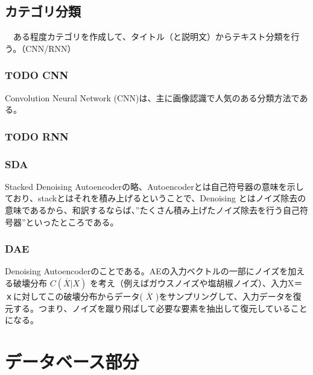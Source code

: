 \documentclass{scrartcl}
\begin{document}
\subsection{カテゴリ分類}
\label{sec:org360a538}
　ある程度カテゴリを作成して、タイトル（と説明文）からテキスト分類を行う。（CNN/RNN）\\
\subsubsection{{\bfseries\sffamily TODO} CNN}
\label{sec:orgfdcfe3a}
Convolution Neural Network (CNN)は、主に画像認識で人気のある分類方法である。\\
\subsubsection{{\bfseries\sffamily TODO} RNN}
\label{sec:org76d83bc}

\subsubsection{SDA \cite{news} \cite{slide01} \cite{page01}}
\label{sec:org4d79792}
Stacked Denoising Autoencoderの略、Autoencoderとは自己符号器の意味を示しており、stackとはそれを積み上げるということで、Denoising とはノイズ除去の意味であるから、和訳するならば、”たくさん積み上げたノイズ除去を行う自己符号器”といったところである。\\

\subsubsection{DAE}
\label{sec:orga78a96a}
Denoising Autoencoderのことである。AEの入力ベクトルの一部にノイズを加える破壊分布 \(C( \overline X | X)\) を考え（例えばガウスノイズや塩胡椒ノイズ）、入力X＝ｘに対してこの破壊分布からデータ( \(\overline X\) )をサンプリングして、入力データを復元する。つまり、ノイズを蹴り飛ばして必要な要素を抽出して復元していることになる。\\
\section{データベース部分}
\label{sec:org1e19b28}

\printbibliography
\end{document}

